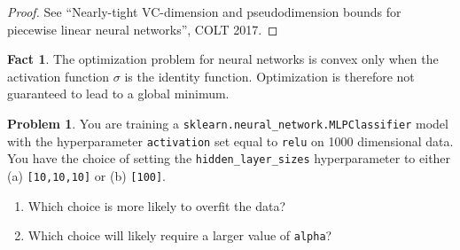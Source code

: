 \documentclass[10pt]{exam}
\theoremstyle{definition}
\newtheorem{problem}{Problem}
\newtheorem{fact}{Fact}
\begin{document}
\begin{proof}
    See ``Nearly-tight VC-dimension and pseudodimension bounds for piecewise linear neural networks'', COLT 2017.
\end{proof}

\begin{fact}
    The optimization problem for neural networks is convex only when the activation function $\sigma$ is the identity function.
    Optimization is therefore not guaranteed to lead to a global minimum.
\end{fact}


\newpage
\begin{problem}
    You are training a \lstinline{sklearn.neural_network.MLPClassifier} model with the hyperparameter \lstinline{activation} set equal to \lstinline{relu} on 1000 dimensional data.
    You have the choice of setting the \lstinline{hidden_layer_sizes} hyperparameter to either (a) \lstinline{[10,10,10]} or (b) \lstinline{[100]}.
    \begin{enumerate}
        \item Which choice is more likely to overfit the data?
            \vspace{3in}
        \item Which choice will likely require a larger value of \lstinline{alpha}?
            \vspace{3in}
    \end{enumerate}
\end{problem}
\end{document}
